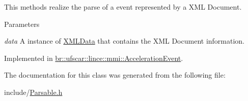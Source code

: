 This methods realize the parse of a event represented by a XML Document. 


\begin{DoxyParams}{Parameters}
\item[{\em data}]A instance of \hyperlink{structbr_1_1ufscar_1_1lince_1_1mmi_1_1XMLData}{XMLData} that contains the XML Document information. \end{DoxyParams}


Implemented in \hyperlink{classbr_1_1ufscar_1_1lince_1_1mmi_1_1AccelerationEvent_a5ad5b14f13e40450e619ce08e4ba9937}{br::ufscar::lince::mmi::AccelerationEvent}.



The documentation for this class was generated from the following file:\begin{DoxyCompactItemize}
\item 
include/\hyperlink{Parsable_8h}{Parsable.h}\end{DoxyCompactItemize}
